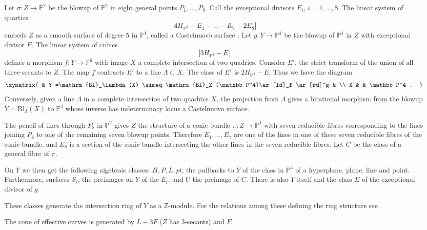 \documentclass[11pt]{amsart}
\theoremstyle{plain}
\numberwithin{equation}{section}
\theoremstyle{definition}
\theoremstyle{remark}
\newcommand{\Z}{\mathbb Z}
\renewcommand{\P}{\mathbb P}
\begin{document}
Let $\sigma \colon Z \to \P^2$ be the blowup of $\P^2$ in eight general points $P_1, \dots, P_8$. Call the exceptional divisors $E_i$, $i=1, \dots , 8$. The linear system of quartics 
\[
|4H_{\P^2} - E_1 - \dots - E_7 - 2E_8|
\]
embeds $Z$ as a smooth surface of degree $5$ in $\P^4$, called a Castelnuovo surface \cite[Theorem 2.10 i)]{Ok83}. Let $g\colon Y\to \P^4$ be the blowup of $\P^4$ in $Z$ with exceptional divisor $E$. The linear system of cubics
\[
| 3H_{\P^4} - E | 
\]
defines a morphism $f \colon Y \to \P^6$ with image $X$ a complete intersection of two quadrics. Consider $E'$, the strict transform of the union of all three-secants to $Z$. The map $f$ contracts $E'$ to a line $\Lambda \subset X$. The class of $E'$ is $2H_{\P^4} -E$. Thus we have the diagram
\[
\xymatrix{
 & Y =\mathrm{Bl}_\Lambda (X) \simeq \mathrm{Bl}_Z (\P^4)\ar[ld]_f \ar[rd]^g & \\
 X & & \P^4 .
}
\]
Conversely, given a line $\Lambda$ in a complete intersection of two quadrics $X$, the projection from $\Lambda$ gives a birational morphism from the blowup $Y=\mathrm{Bl}_\Lambda (X)$ to $\P^4$ whose inverse has indeterminacy locus a Castelnuovo surface. 

The pencil of lines through $P_8$ in $\P^2$ gives $Z$ the structure of a conic bundle $\pi \colon Z \to \P^1$ with seven reducible fibres corresponding to the lines joining $P_8$ to one of the remaining seven blowup points. Therefore $E_1, \dots, E_7$ are one of the lines in one of these seven reducible fibres of the conic bundle, and $E_8$ is a section of the conic bundle intersecting the other lines in the seven reducible fibres. Let $C$ be the class of a general fibre of $\pi$. 

On $Y$ we then get the following algebraic classes: $H, P, L, pt$, the pullbacks to $Y$ of the class in $\P^4$ of a hyperplane, plane, line and point. Furthermore, surfaces $S_i$, the preimages on $Y$ of the $E_i$, and $U$ the preimage of $C$. There is also $Y$ itself and the class $E$ of the exceptional divisor of $g$. 

These classes generate the intersection ring of $Y$ as a $\Z$-module. For the relations among these defining the ring structure see \cite{BvBS26}. 

The cone of effective curves is generated by $L-3F$ ($Z$ has $3$-secants) and $F$. 
\end{document}
